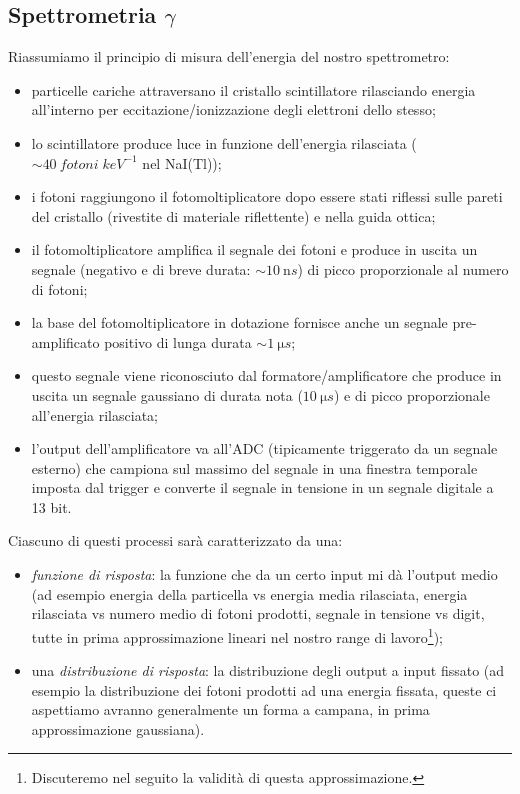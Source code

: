 \subsection{Spettrometria $\gamma$}
Riassumiamo il principio di misura dell'energia del nostro spettrometro:
\begin{itemize}
	\item particelle cariche attraversano il cristallo scintillatore rilasciando energia all'interno per eccitazione/ionizzazione degli elettroni dello stesso;
	\item lo scintillatore produce luce in funzione dell'energia rilasciata ($\sim \SI{40}{fotoni \; keV^{-1}}$ nel NaI(Tl));
	\item i fotoni raggiungono il fotomoltiplicatore dopo essere stati riflessi sulle pareti del cristallo (rivestite di materiale riflettente) e nella guida ottica;
	\item il fotomoltiplicatore amplifica il segnale dei fotoni e produce in uscita un segnale (negativo e di breve durata: $\sim \SI{10}{\nano s}$) di picco proporzionale al numero di fotoni;
	\item la base del fotomoltiplicatore in dotazione fornisce anche un segnale pre-amplificato positivo di lunga durata $\sim \SI{1}{\micro s}$;
	\item questo segnale viene riconosciuto dal formatore/amplificatore che produce in uscita un segnale gaussiano di durata nota ($\SI{10}{\micro s}$) e di picco proporzionale all'energia rilasciata;
	\item l'output dell'amplificatore va all'ADC (tipicamente triggerato da un segnale esterno) che campiona sul massimo del segnale in una finestra temporale imposta dal trigger e converte il segnale in tensione in un segnale digitale a 13 bit.
\end{itemize}
Ciascuno di questi processi sarà caratterizzato da una:
\begin{itemize}
	\item\emph{funzione di risposta}: la funzione che da un certo input mi dà l'output medio (ad esempio energia della particella vs energia media rilasciata, energia rilasciata vs numero medio di fotoni prodotti, segnale in tensione vs digit, tutte in prima approssimazione lineari nel nostro range di lavoro\footnote{Discuteremo nel seguito la validità di questa approssimazione.});
    \item una \emph{distribuzione di risposta}: la distribuzione degli output a input fissato (ad esempio la distribuzione dei fotoni prodotti ad una energia fissata, queste ci aspettiamo avranno generalmente un forma a campana, in prima approssimazione gaussiana).
\end{itemize}
